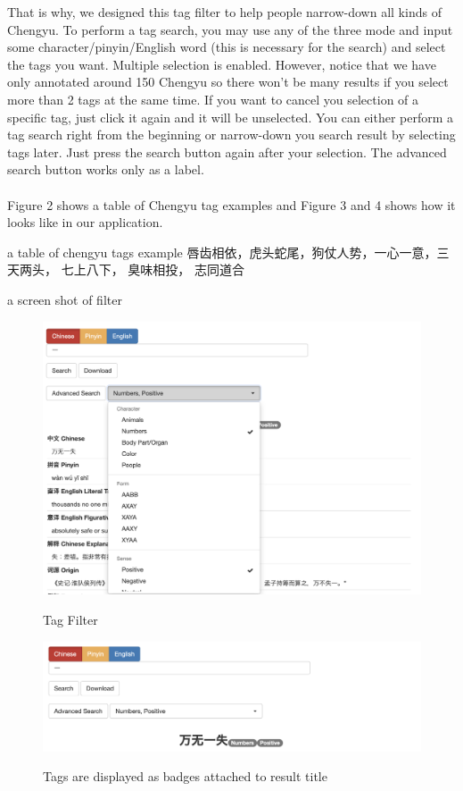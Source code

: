 \documentclass[11pt]{article} %
\begin{document}
That is why, we designed this tag filter to help people narrow-down all kinds of Chengyu. To perform a tag search, you may use any of the three mode and input some character/pinyin/English word (this is necessary for the search) and select the tags you want. Multiple selection is enabled. However, notice that we have only annotated around 150 Chengyu so there won't be many results if you select more than 2 tags at the same time. If you want to cancel you selection of a specific tag, just click it again and it will be unselected. You can either perform a tag search right from the beginning or narrow-down you search result by selecting tags later. Just press the search button again after your selection. The advanced search button works only as a label. \\
\\
Figure 2 shows a table of Chengyu tag examples and Figure 3 and 4 shows how it looks like in our application. 

\indent a table of chengyu tags example 唇齿相依，虎头蛇尾，狗仗人势，一心一意，三天两头， 七上八下， 臭味相投， 志同道合

\indent a screen shot of filter
\begin{figure}[htbp]
\begin{center}
\includegraphics[width=14cm]{filter.png}
\caption{Tag Filter}
\label{default}
\includegraphics[width=14cm]{badge1.png}
\caption{Tags are displayed as badges attached to result title}
\label{default}
\end{center}
\end{figure}
\end{document}
